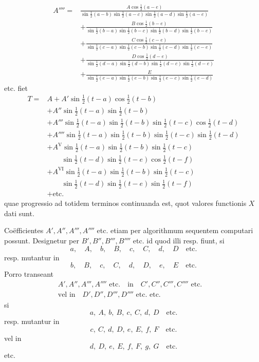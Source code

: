\[\begin{aligned}
A''''={}&\frac{A\cos\tfrac12(a-e)}{\sin\tfrac12(a-b)\sin\tfrac12(a-c)\sin\tfrac12(a-d)\sin\tfrac12(a-e)}\\[5pt]
&+\frac{B\cos\tfrac12(b-e)}{\sin\tfrac12(b-a)\sin\tfrac12(b-c)\sin\tfrac12(b-d)\sin\tfrac12(b-e)}\\[5pt]
&+\frac{C\cos\tfrac12(c-e)}{\sin\tfrac12(c-a)\sin\tfrac12(c-b)\sin\tfrac12(c-d)\sin\tfrac12(c-e)}\\[5pt]
&+\frac{D\cos\tfrac12(d-e)}{\sin\tfrac12(d-a)\sin\tfrac12(d-b)\sin\tfrac12(d-c)\sin\tfrac12(d-e)}\\[5pt]
&+\frac{E}{\sin\tfrac12(e-a)\sin\tfrac12(e-b)\sin\tfrac12(e-c)\sin\tfrac12(e-d)}
\end{aligned}
\]
etc. fiet
\[
\begin{aligned}
T={}&A+A'\sin\tfrac12(t-a)\cos\tfrac12(t-b)\\[5pt]
&+A''\sin\tfrac12(t-a)\sin\tfrac12(t-b)\\[5pt]
&+A'''\sin\tfrac12(t-a)\sin\tfrac12(t-b)\sin\tfrac12(t-c)\cos\tfrac12(t-d)\\[5pt]
&+A''''\sin\tfrac12(t-a)\sin\tfrac12(t-b)\sin\tfrac12(t-c)\sin\tfrac12(t-d)\\[5pt]
&+A^{\mathrm{V}}\sin\tfrac12(t-a)\sin\tfrac12(t-b)\sin\tfrac12(t-c)\\[5pt]&\qquad \sin\tfrac12(t-d)\sin\tfrac12(t-e)\cos\tfrac12(t-f)\\[5pt]
&+A^{\mathrm{VI}}\sin\tfrac12(t-a)\sin\tfrac12(t-b)\sin\tfrac12(t-c)\\[5pt]&\qquad \sin\tfrac12(t-d)\sin\tfrac12(t-e)\sin\tfrac12(t-f)\\[5pt]
&+\text{etc.}
\end{aligned}
\]
quae progressio ad totidem terminos continuanda est, quot valores functionis $X$
dati sunt.

Coëfficientes $A',A'',A''',A''''$ etc. etiam per algorithmum sequentem computari possunt.
Designetur per $B',B'',B''',B''''$ etc. id quod illi resp. fiunt, si
\[
a,\quad A,\quad b,\quad B,\quad c,\quad C,\quad d,\quad D\quad\text{etc.}
\]
resp. mutantur in
\[
b,\quad B,\quad c,\quad C,\quad d,\quad D,\quad e,\quad E\quad\text{etc.}
\]
Porro transeant
\[\begin{gathered}
A',A'',A''',A''''\text{ etc.}\quad\text{in}\quad C',C'',C''',C''''\text{ etc.}\quad
\\[5pt]\text{vel in}\quad D',D'',D''',D''''\text{ etc. etc.}
\end{gathered}\]
si
\[
a,\ A,\ b,\ B,\ c,\ C,\ d,\ D\quad\text{etc.}
\]
resp. mutantur in
\[
c,\ C,\ d,\ D,\ e,\ E,\ f,\ F\quad\text{etc.}
\]
vel in
\[
d,\ D,\ e,\ E,\ f,\ F,\ g,\ G\quad\text{etc.}
\]
\hspace*{2em}etc.

